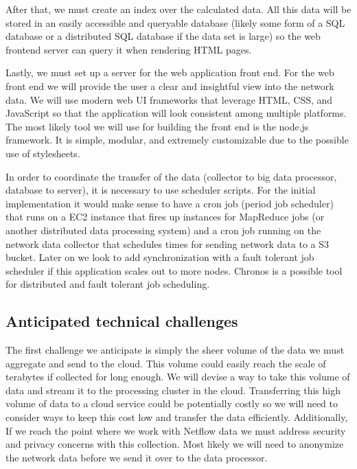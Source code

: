 \documentclass{sig-alternate}
\begin{document}
After that, we must create an index over the calculated data. All this data will
be stored in an easily accessible and queryable database (likely some form of a
SQL database or a distributed SQL database if the data set is large) so the web
frontend server can query it when rendering HTML pages.

Lastly, we must set up a server for the web application front end. For the web
front end we will provide the user a clear and insightful view into the network
data. We will use modern web UI frameworks that leverage HTML, CSS, and
JavaScript so that the application will look consistent among multiple
platforms. The most likely tool we will use for building the front end is the
node.js framework. It is simple, modular, and extremely customizable due to the
possible use of stylesheets.

In order to coordinate the transfer of the data (collector to big data
processor, database to server), it is necessary to use scheduler scripts. For
the initial implementation it would make sense to have a cron job (period job
scheduler) that runs on a EC2 instance that fires up instances for MapReduce
jobs (or another distributed data processing system) and a cron job running on
the network data collector that schedules times for sending network data to a S3
bucket. Later on we look to add synchronization with a fault tolerant job
scheduler if this application scales out to more nodes. Chronos is a possible
tool for distributed and fault tolerant job scheduling.\cite{AirbnbChronos}

\subsection{Anticipated technical challenges}

The first challenge we anticipate is simply the sheer volume of the data we must
aggregate and send to the cloud. This volume could easily reach the scale of
terabytes if collected for long enough. We will devise a way to take this volume
of data and stream it to the processing cluster in the cloud. Transferring this
high volume of data to a cloud service could be potentially costly so we will
need to consider ways to keep this cost low and transfer the data efficiently.
Additionally, If we reach the point where we work with Netflow data we must
address security and privacy concerns with this collection. Most likely we will
need to anonymize the network data before we send it over to the data processor.
\end{document}

